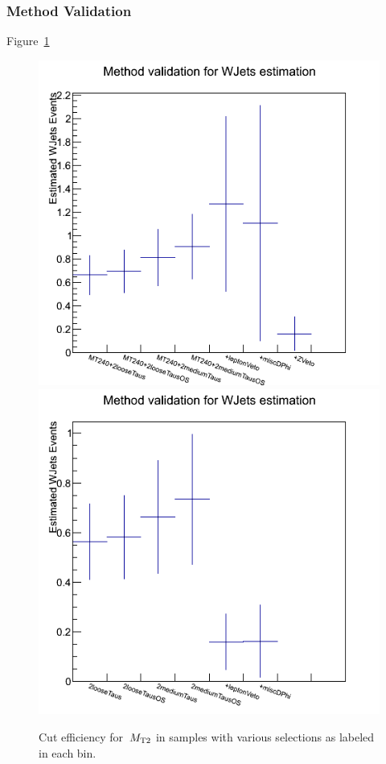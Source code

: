 \subsubsection{Method Validation}
Figure~\ref{fig:justification_bin1}  
\begin{figure}[htbp]
\centering
\includegraphics[angle=0,scale=0.35]{TauTauFigs/withMT2GT40.png}
\includegraphics[angle=0,scale=0.35]{TauTauFigs/withMT2GT40ZVeto.png} \\
\caption{Cut efficiency for $\,{M_{\rm T2}}$ %
in samples with various selections as labeled in each bin.}
\label{fig:justification_bin1}
\end{figure}
